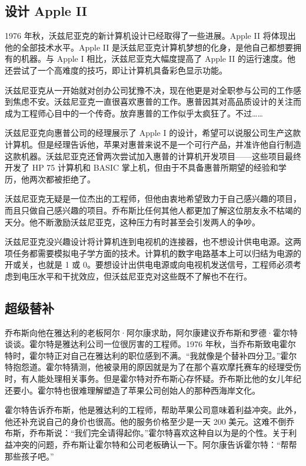 \documentclass[12pt,UTF8]{ctexbook}
\begin{document}
\subsection{设计 Apple II}


1976 年秋，沃兹尼亚克的新计算机设计已经取得了一些进展。Apple II 将体现出他的全部技术水平。Apple II 是沃兹尼亚克计算机梦想的化身，是他自己都想要拥有的机器。与 Apple I 相比，沃兹尼亚克大幅度提高了 Apple II 的运行速度。他还尝试了一个高难度的技巧，即让计算机具备彩色显示功能。

沃兹尼亚克从一开始就对创办公司犹豫不决，现在他更是对全职参与公司的工作感到焦虑不安。沃兹尼亚克一直很喜欢惠普的工作。惠普因其对高品质设计的关注而成为工程师心目中的一个传奇。放弃惠普的工作似乎太疯狂了。不过……

沃兹尼亚克向惠普公司的经理展示了 Apple I 的设计，希望可以说服公司生产这款计算机。但是经理告诉他，苹果对惠普来说不是一个可行产品，并准许他自行制造这款机器。沃兹尼亚克还曾两次尝试加入惠普的计算机开发项目——这些项目最终开发了 HP 75 计算机和 BASIC 掌上机，但由于不具备惠普所期望的经验和学历，他两次都被拒绝了。

沃兹尼亚克无疑是一位杰出的工程师，但他由衷地希望致力于自己感兴趣的项目，而且只做自己感兴趣的项目。乔布斯比任何其他人都更加了解这位朋友永不枯竭的天分。他不断激励沃兹尼亚克，这种压力有时甚至会引发两人的争吵。

沃兹尼亚克没兴趣设计将计算机连到电视机的连接器，也不想设计供电电源。这两项任务都需要模拟电子学方面的技术。计算机的数字电路基本上可以归结为电源的开或关，也就是 1 或 0。要想设计出供电电源或向电视机发送信号，工程师必须考虑到电压水平和干扰效应，但沃兹尼亚克对这些既不了解也不在行。





\subsection{超级替补}


乔布斯向他在雅达利的老板阿尔·阿尔康求助，阿尔康建议乔布斯和罗德·霍尔特谈谈。霍尔特是雅达利公司一位很厉害的工程师。1976 年秋，当乔布斯致电霍尔特时，霍尔特正对自己在雅达利的职位感到不满。“我就像是个替补四分卫。”霍尔特抱怨道。霍尔特猜测，他被录用的原因就是为了在那个喜欢摩托赛车的经理受伤时，有人能处理相关事务。但是霍尔特对乔布斯心存怀疑。乔布斯比他的女儿年纪还要小。霍尔特也很难理解塑造了苹果公司创始人的那种西海岸文化。

霍尔特告诉乔布斯，他是雅达利的工程师，帮助苹果公司意味着利益冲突。此外，他还补充说自己的身价也很高。他的服务价格至少是一天 200 美元。这难不倒乔布斯，乔布斯说：“我们完全请得起你。”霍尔特喜欢这种自以为是的个性。关于利益冲突的问题，乔布斯让霍尔特和公司老板确认一下。阿尔康告诉霍尔特：“帮帮那些孩子吧。”
\end{document}
